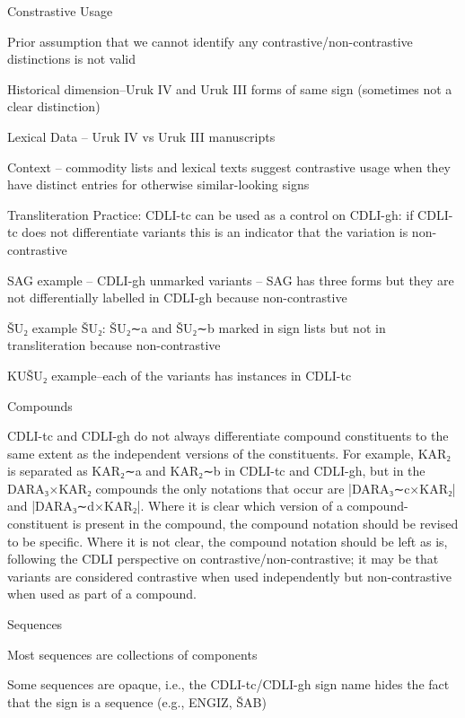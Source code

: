 \Hendul
\Hhhh{}Constrastive Usage

\Hul\Hli{}Prior assumption that we cannot identify any
	contrastive/non-contrastive distinctions is not valid

\Hli{}Historical dimension--Uruk IV and Uruk III forms of same sign
	(sometimes not a clear distinction)

\Hli{}Lexical Data -- Uruk IV vs Uruk III manuscripts

\Hli{}Context -- commodity lists and lexical texts suggest
  	contrastive usage when they have distinct entries for
  	otherwise similar-looking signs

\Hli{}Transliteration Practice:
	\Hul\Hli{}CDLI-tc can be used as a control on CDLI-gh: if CDLI-tc
  	  does not differentiate variants this is an indicator that
  	  the variation is non-contrastive

\Hli{}SAG example -- CDLI-gh unmarked variants -- SAG has
  	  three forms but they are not differentially labelled in
  	  CDLI-gh because non-contrastive

\Hli{}ŠU₂ example ŠU₂: ŠU₂∼a and ŠU₂∼b marked in sign lists
  	  but not in transliteration because non-contrastive

\Hli{}KUŠU₂ example--each of the variants has instances in CDLI-tc

\Hendul


\Hendul
\Hhhh{}Compounds


\par CDLI-tc and CDLI-gh do not always differentiate compound
      constituents to the same extent as the independent versions of
      the constituents.  For example, KAR₂ is separated as KAR₂∼a and
      KAR₂∼b in CDLI-tc and CDLI-gh, but in the DARA₃×KAR₂ compounds
      the only notations that occur are |DARA₃∼c×KAR₂| and
      |DARA₃∼d×KAR₂|.  Where it is clear which version of a
      compound-constituent is present in the compound, the compound
      notation should be revised to be specific.  Where it is not
      clear, the compound notation should be left as is, following the
      CDLI perspective on contrastive/non-contrastive; it may be that
      variants are considered contrastive when used independently but
      non-contrastive when used as part of a compound.

\Hhhh{}Sequences

\Hul\Hli{}Most sequences are collections of components

\Hli{}Some sequences are opaque, i.e., the CDLI-tc/CDLI-gh sign
	name hides the fact that the sign is a sequence (e.g., ENGIZ,
	ŠAB)

